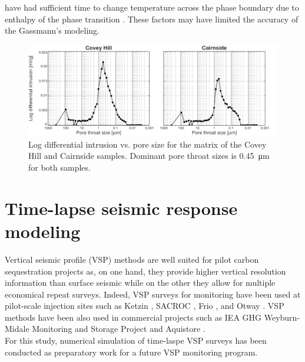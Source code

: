 have had sufficient time to change temperature across the phase boundary due to
enthalpy of the phase transition \citep{Kofman2013}. These factors may have
limited the accuracy of the Gassmann's modeling.
\begin{figure}[!ht]
\centering
\includegraphics[width=1\textwidth]{fig/pore_size.pdf}
\caption{Log differential intrusion vs. pore size for the matrix of the Covey
Hill and Cairnside samples. Dominant pore throat sizes is
\SI{0.45}{\micro\metre} for both samples.}
\label{fig:poresize}
\end{figure}
\section{Time-lapse seismic response modeling}
Vertical seismic profile (VSP) methods are well suited for pilot carbon
sequestration projects as, on one hand, they provide higher vertical resolution
information than surface seismic \citep{Yang2014} while on the other they allow
for multiple economical repeat surveys. Indeed, VSP surveys for 
monitoring have been used at pilot-scale  injection sites such as Ketzin
\citep{Yang2010, Ivandic2012, Gotz2014, Diersch2014}, SACROC
\citep{Yang2014,Cheng2010}, Frio \citep{Daley2007}, and Otway
\citep{Urosevic2008}. VSP methods have been also used in commercial projects
such as IEA GHG Weyburn-Midale  Monitoring and Storage Project
\citep{Bellefleur2004} and Aquistore \citep{White2014}.\\
 For this study, numerical simulation of time-laspe VSP surveys has been
conducted as preparatory work for a future VSP monitoring program.
